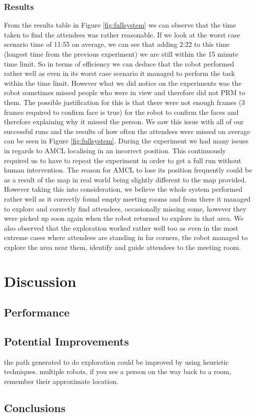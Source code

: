 \documentclass[conference]{IEEEtran}
\begin{document}
\subsubsection{Results}
From the results table  in Figure \ref{fig:fullsystem} we can observe that the time taken to find the attendees was rather reasonable. If we look at the worst case scenario time of 11:55 on average, we can see that adding 2:22 to this time (longest time from the previous experiment) we are still within the 15 minute time limit. So in terms of efficiency we can deduce that the robot performed rather well as even in its worst case scenario it managed to perform the task within the time limit. However what we did notice on the experiments was the robot sometimes missed people who were in view and therefore did not PRM to them. The possible justification for this is that there were not enough frames (3 frames required to confirm face is true) for the robot to confirm the faces and therefore explaining why it missed the person. We saw this issue with all of our successful runs and the results of how often the attendees were missed on average can be seen in  Figure \ref{fig:fullsystem}. During the experiment we had many issues in regards to AMCL localising in an incorrect position. This continuously required us to have to repeat the experiment in order to get a full run without human intervention. The reason for AMCL to lose its position frequently could be as a result of the map in real world being slightly different to the map provided. However taking this into consideration, we believe the whole system performed rather well as it correctly found empty meeting rooms and from there it managed to explore and correctly find attendees, occasionally missing some, however they were picked up soon again when the robot returned to explore in that area. We also observed that the exploration worked rather well too as even in the most extreme cases where attendees are standing in far corners, the robot managed to explore the area near them, identify and guide attendees to the meeting room.
\section{Discussion}
\subsection{Performance}
\subsection{Potential Improvements}

the path generated to do exploration could be improved by using heuristic techniques. multiple robots, if you see a person on the way back to a room, remember their approximate location.
\subsection{Conclusions}


\end{document}
